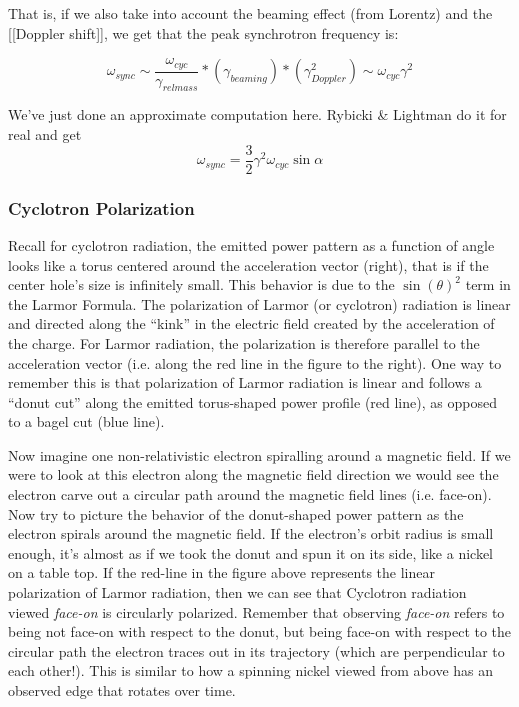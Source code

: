 \documentclass{article}
\begin{document}
That is, if we also take into account the beaming effect (from Lorentz) and the [[Doppler shift]], we get that the peak synchrotron frequency is:

$$\omega_{sync} \sim \frac{\omega_{cyc}}{\gamma_{rel mass}} * (\gamma_{beaming}) * (\gamma_{Doppler}^2) \sim \omega_{cyc}\gamma^2$$

We've just done 
an approximate computation here.  Rybicki \& Lightman do it
for real and get
$$\boxed{\omega_{sync}=\frac{3}{2}\gamma^2\omega_{cyc}\sin\alpha}$$


\subsubsection{Cyclotron Polarization}

Recall for cyclotron radiation, the emitted power pattern as a function of angle looks like a torus centered around the acceleration vector (right), that is if the center hole's size is infinitely small. This behavior is due to the $\sin(\theta)^{2}$ term in the Larmor Formula. The polarization of Larmor (or cyclotron) radiation is linear and directed along the ``kink'' in the electric field created by the acceleration of the charge. For Larmor radiation, the polarization is therefore parallel to the acceleration vector (i.e. along the red line in the figure to the right). One way to remember this is that polarization of Larmor radiation is linear and follows a ``donut cut'' along the emitted torus-shaped power profile (red line), as opposed to a bagel cut (blue line).

Now imagine one non-relativistic electron spiralling around a magnetic field. If we were to look at this electron along the magnetic field direction we would see the electron carve out a circular path around the magnetic field lines (i.e. face-on). Now try to picture the behavior of the donut-shaped power pattern as the electron spirals around the magnetic field. If the electron's orbit radius is small enough, it's almost as if we took the donut and spun it on its side, like a nickel on a table top. If the red-line in the figure above represents the linear polarization of Larmor radiation, then we can see that Cyclotron radiation viewed \emph{face-on} is circularly polarized. Remember that observing \emph{face-on} refers to being not face-on with respect to the donut, but being face-on with respect to the circular path the electron traces out in its trajectory (which are perpendicular to each other!). This is similar to how a spinning nickel viewed from above has an observed edge that rotates over time.
\end{document}
